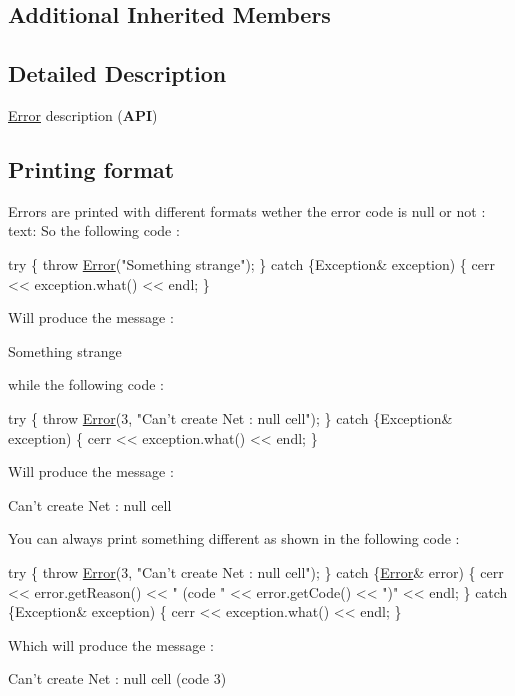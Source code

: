 \subsection*{Additional Inherited Members}


\subsection{Detailed Description}
\mbox{\hyperlink{classHurricane_1_1Error}{Error}} description ({\bfseries A\+PI}) 

\hypertarget{classHurricane_1_1Error_secErrorPrintingFormat}{}\subsection{Printing format}\label{classHurricane_1_1Error_secErrorPrintingFormat}
Errors are printed with different formats wether the error code is null or not \+: text\+: So the following code \+: 
\begin{DoxyCode}
\textcolor{keywordflow}{try} \{
   \textcolor{keywordflow}{throw} \mbox{\hyperlink{classHurricane_1_1Error_ab58387c890740ed8082532c5342f2d03}{Error}}(\textcolor{stringliteral}{"Something strange"});
\}
\textcolor{keywordflow}{catch} \{Exception& exception) \{
   cerr << exception.what() << endl;
\}
\end{DoxyCode}
 Will produce the message \+: 
\begin{DoxyCode}
[ERROR] Something strange
\end{DoxyCode}
 while the following code \+: 
\begin{DoxyCode}
\textcolor{keywordflow}{try} \{
   \textcolor{keywordflow}{throw} \mbox{\hyperlink{classHurricane_1_1Error_ab58387c890740ed8082532c5342f2d03}{Error}}(3, \textcolor{stringliteral}{"Can't create Net : null cell"});
\}
\textcolor{keywordflow}{catch} \{Exception& exception) \{
   cerr << exception.what() << endl;
\}
\end{DoxyCode}
 Will produce the message \+: 
\begin{DoxyCode}
[ERROR:3] Can\textcolor{stringliteral}{'t create Net : null cell}
\end{DoxyCode}
 You can always print something different as shown in the following code \+: 
\begin{DoxyCode}
\textcolor{keywordflow}{try} \{
   \textcolor{keywordflow}{throw} \mbox{\hyperlink{classHurricane_1_1Error_ab58387c890740ed8082532c5342f2d03}{Error}}(3, \textcolor{stringliteral}{"Can't create Net : null cell"});
\}
\textcolor{keywordflow}{catch} \{\mbox{\hyperlink{classHurricane_1_1Error_ab58387c890740ed8082532c5342f2d03}{Error}}& error) \{
   cerr << error.getReason() << \textcolor{stringliteral}{" (code "} << error.getCode() << \textcolor{stringliteral}{")"} << endl;
\}
\textcolor{keywordflow}{catch} \{Exception& exception) \{
   cerr << exception.what() << endl;
\}
\end{DoxyCode}
 Which will produce the message \+: 
\begin{DoxyCode}
Can\textcolor{stringliteral}{'t create Net : null cell (code 3)}
\end{DoxyCode}
 

